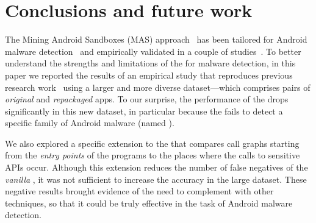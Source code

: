 \section{Conclusions and future work}\label{sec:conclusions}

The Mining Android Sandboxes (MAS) approach~\cite{DBLP:conf/icse/JamrozikZ16} has been tailored for Android malware detection~\cite{DBLP:conf/wcre/BaoLL18}
and empirically validated in a couple of studies~\cite{DBLP:conf/wcre/BaoLL18,DBLP:conf/iceccs/LeB0GL18,DBLP:journals/jss/CostaMMSSBNR22}.
To better understand the strengths and limitations of the \mas for malware detection,
in this paper we reported the results of an empirical study that reproduces previous research
work~\cite{DBLP:conf/wcre/BaoLL18,DBLP:journals/jss/CostaMMSSBNR22} using a larger and more
diverse dataset---which comprises \apps pairs of \emph{original} and \emph{repackaged} apps.
To our surprise, the performance of the \mas drops significantly in this new dataset, in particular
because the \mas fails to detect a specific family of Android malware (named \gps). 

We also explored a specific extension to the \mas that compares call graphs starting from
the \emph{entry points} of the programs to the places where the calls to sensitive APIs occur. Although
this extension reduces the number of false negatives of the \emph{vanilla \mas}, it was not
sufficient to increase the \mas accuracy in the large dataset. These negative results
brought evidence of the need to complement \mas with other techniques, so that it could be
truly effective in the task of Android malware detection.
